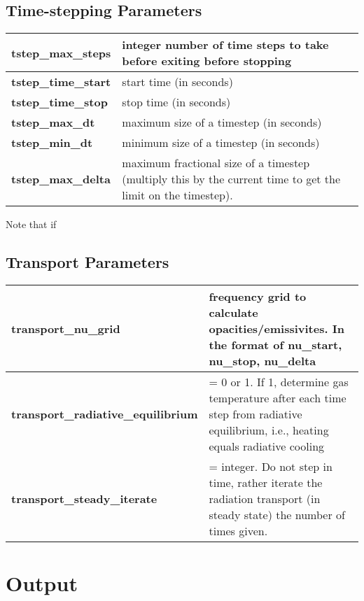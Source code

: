 \documentclass[11pt,letterpaper]{article}
\begin{document}
\subsection{Time-stepping Parameters}

\begin {table}[h]
\begin{tabular}{| >{\bf}l | p{12cm} |  }
\hline
\hline
  tstep\_max\_steps    &  integer number of time steps to take before exiting before stopping \\ \hline
     tstep\_time\_start    & start time (in seconds) \\ \hline
   tstep\_time\_stop    & stop time (in seconds) \\ \hline
  tstep\_max\_dt        & maximum size of a timestep (in seconds)  \\ \hline
 tstep\_min\_dt          & minimum size of a timestep (in seconds)\\ \hline
 tstep\_max\_delta   &  maximum fractional size of a timestep (multiply this by 
 the current time to get the limit on the timestep). \\ \hline
\hline
\end{tabular}
\end{table}

Note that if
\subsection{Transport Parameters}


\begin {table}[h]
\begin{tabular}{| >{\bf}l | p{10cm} |  }
\hline
\hline
transport\_nu\_grid  & frequency grid to calculate opacities/emissivites. In the format of {nu\_start, nu\_stop, nu\_delta} \\ \hline
transport\_radiative\_equilibrium  & = 0 or 1. If 1, determine gas temperature after each time step from radiative equilibrium, i.e., heating equals radiative cooling \\ \hline
transport\_steady\_iterate    & = integer. Do not step in time, rather iterate the radiation transport (in steady state) the number of times given. \\ \hline
\hline
\end{tabular}
\end{table}


\newpage


\section{Output}
\end{document}
